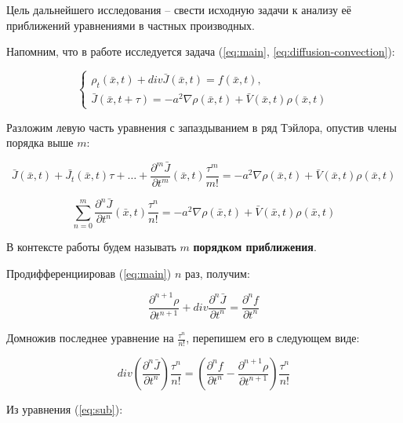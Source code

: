 Цель дальнейшего исследования \--- свести исходную задачи к анализу её приближений уравнениями в частных производных.

Напомним, что в работе исследуется задача (\ref{eq:main}, \ref{eq:diffusion-convection}):

\begin{equation}
\left\{
\begin{aligned}
\rho_t(\bar{x},t) + div \bar{J}(\bar{x},t) = f(\bar{x},t),\\
\bar{J}(\bar{x},t+\tau) = -a^2 \nabla \rho(\bar{x},t) + \bar{V}(\bar{x},t) \rho(\bar{x},t)
\end{aligned}
\right.
\end{equation}

Разложим левую часть уравнения с запаздыванием в ряд Тэйлора, опустив члены порядка выше $m$:

\begin{equation}
\bar{J}(\bar{x},t) + \bar{J_t}(\bar{x},t) \tau + \dots + \dfrac{\partial^m \bar{J}}{\partial t^m}(\bar{x},t) \dfrac{\tau^m}{m!} = -a^2 \nabla \rho(\bar{x},t) + \bar{V}(\bar{x},t) \rho(\bar{x},t)
\end{equation}

\begin{equation}\label{eq:sub}
\sum\limits_{n=0}^{m} \dfrac{\partial^n \bar{J}}{\partial t^n}(\bar{x},t) \dfrac{\tau^n}{n!} = -a^2 \nabla \rho(\bar{x},t) + \bar{V}(\bar{x},t) \rho(\bar{x},t)
\end{equation}

В контексте работы будем называть $m$ \textbf{порядком приближения}.

Продифференциировав (\ref{eq:main}) $n$ раз, получим:

\begin{equation}
\dfrac{\partial^{n+1} \rho}{\partial t^{n+1}} + div \dfrac{\partial^n \bar{J}}{\partial t^n} = \dfrac{\partial^n f}{\partial t^n}
\end{equation}

Домножив последнее уравнение на $\frac{\tau^n}{n!}$, перепишем его в следующем виде:

\begin{equation}\label{eq:div}
div \left( \dfrac{\partial^n \bar{J}}{\partial t^n} \right) \dfrac{\tau^n}{n!} = \left(\dfrac{\partial^n f}{\partial t^n} - \dfrac{\partial^{n+1} \rho}{\partial t^{n+1}} \right) \dfrac{\tau^n}{n!}
\end{equation}

Из уравнения (\ref{eq:sub}):

